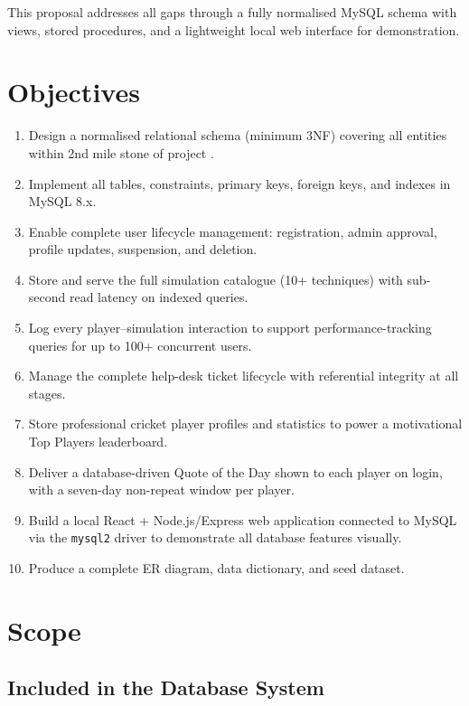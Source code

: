 \documentclass[12pt,a4paper]{article}
\begin{document}
This proposal addresses all gaps through a fully normalised MySQL schema with views,
stored procedures, and a lightweight local web interface for demonstration.

\section{Objectives}

\begin{enumerate}[leftmargin=1.5em]
    \item Design a normalised relational schema (minimum 3NF) covering all entities
    within 2nd mile stone  of project .
    \item Implement all tables, constraints, primary keys, foreign keys, and indexes
    in MySQL 8.x.
    \item Enable complete user lifecycle management: registration, admin approval,
    profile updates, suspension, and deletion.
    \item Store and serve the full simulation catalogue (10+ techniques) with
    sub-second read latency on indexed queries.
    \item Log every player--simulation interaction to support performance-tracking
    queries for up to 100+ concurrent users.
    \item Manage the complete help-desk ticket lifecycle with referential integrity
    at all stages.
    \item Store professional cricket player profiles and statistics to power a
    motivational Top Players leaderboard.
    \item Deliver a database-driven Quote of the Day shown to each player on login,
    with a seven-day non-repeat window per player.
    \item Build a local React + Node.js/Express web application connected to MySQL
    via the \texttt{mysql2} driver to demonstrate all database features visually.
    \item Produce a complete ER diagram, data dictionary, and seed dataset.
\end{enumerate}

\section{Scope}

\subsection{Included in the Database System}
\end{document}
